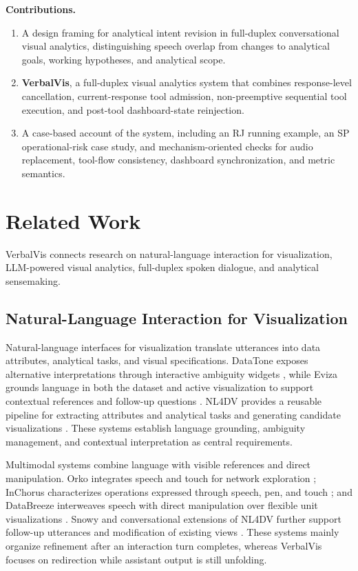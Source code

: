 \documentclass[journal]{IEEEtran}
\begin{document}
\textbf{Contributions.}
\begin{enumerate}
\setlength{\itemsep}{1pt}
\setlength{\parskip}{0pt}

\item A design framing for analytical intent revision in full-duplex conversational visual analytics, distinguishing speech overlap from changes to analytical goals, working hypotheses, and analytical scope.

\item \textbf{VerbalVis}, a full-duplex visual analytics system that combines response-level cancellation, current-response tool admission, non-preemptive sequential tool execution, and post-tool dashboard-state reinjection.

\item A case-based account of the system, including an RJ running example, an SP operational-risk case study, and mechanism-oriented checks for audio replacement, tool-flow consistency, dashboard synchronization, and metric semantics.
\end{enumerate}

\section{Related Work}
\label{sec:related}

VerbalVis connects research on natural-language interaction for visualization, LLM-powered visual analytics, full-duplex spoken dialogue, and analytical sensemaking.

\subsection{Natural-Language Interaction for Visualization}
\label{sec:rw-nli}

Natural-language interfaces for visualization translate utterances into data attributes, analytical tasks, and visual specifications. DataTone exposes alternative interpretations through interactive ambiguity widgets \cite{gao2015datatone}, while Eviza grounds language in both the dataset and active visualization to support contextual references and follow-up questions \cite{setlur2016eviza}. NL4DV provides a reusable pipeline for extracting attributes and analytical tasks and generating candidate visualizations \cite{narechania2021nl4dv}. These systems establish language grounding, ambiguity management, and contextual interpretation as central requirements.

Multimodal systems combine language with visible references and direct manipulation. Orko integrates speech and touch for network exploration \cite{srinivasan2018orko}; InChorus characterizes operations expressed through speech, pen, and touch \cite{srinivasan2020inchorus}; and DataBreeze interweaves speech with direct manipulation over flexible unit visualizations \cite{srinivasan2021databreeze}. Snowy and conversational extensions of NL4DV further support follow-up utterances and modification of existing views \cite{srinivasan2021snowy,mitra2022conversational}. These systems mainly organize refinement after an interaction turn completes, whereas VerbalVis focuses on redirection while assistant output is still unfolding.
\end{document}
